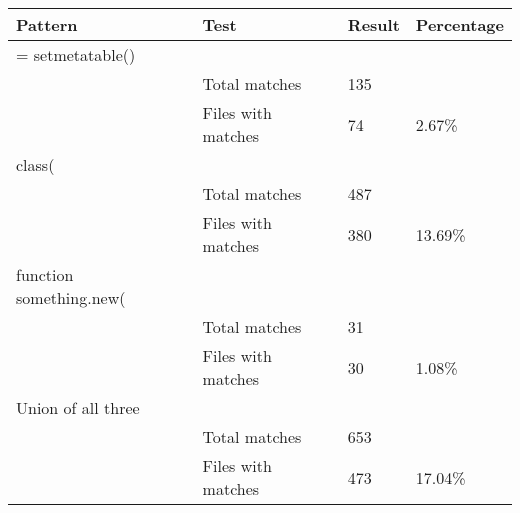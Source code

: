 \begin{center}
	\label{LuaResults}
	\begin{tabular}{|l|l|l|l|}
		\hline
		Pattern                 & Test               & Result & Percentage \\ \hline
		= setmetatable()        &                    &        &            \\ \hline
		& Total matches      & 135    &            \\ \hline
		& Files with matches & 74     & 2.67\%     \\ \hline
		class(                  &                    &        &            \\ \hline
		& Total matches      & 487    &            \\ \hline
		& Files with matches & 380    & 13.69\%    \\ \hline
		function something.new( &                    &        &            \\ \hline
		& Total matches      & 31     &            \\ \hline
		& Files with matches & 30     & 1.08\%     \\ \hline
		Union of all three      &                    &        &            \\ \hline
		& Total matches      & 653    &            \\ \hline
		& Files with matches & 473    & 17.04\%    \\ \hline
	\end{tabular}
\end{center}{










\iffalse
}
